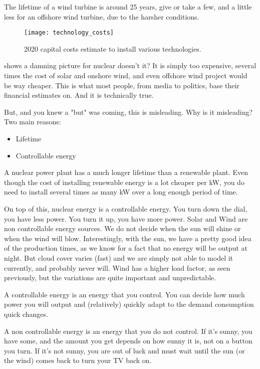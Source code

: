 The lifetime of a wind turbine is around 25 years, give or take a few, and a little less for an offshore wind turbine, due to the harsher conditions.



\begin{figure}[hb]
	\texttt{[image: technology\_costs]}
	\caption[2020 capital costs estimate to install various technologies]{2020 capital costs estimate to install various technologies.}
\end{figure}


 shows a damning picture for nuclear doesn't it? It is simply too expensive, several times the cost of solar and onshore wind, and even offshore wind project would be way cheaper. This is what most people, from media to politics, base their financial estimates on. And it is technically true.

But, and you knew a "but" was coming, this is misleading. Why is it misleading? Two main reasons:


\begin{itemize}
	\item Lifetime
	\item Controllable energy
\end{itemize}

A nuclear power plant has a much longer lifetime than a renewable plant. Even though the cost of installing renewable energy is a lot cheaper per kW, you do need to install several times as many kW over a long enough period of time.

On top of this, nuclear energy is a controllable energy. You turn down the dial, you have less power. You turn it up, you have more power. Solar and Wind are non controllable energy sources. We do not decide when the sun will shine or when the wind will blow. Interestingly, with the sun, we have a pretty good idea of the production times, as we know for a fact that no energy will be output at night. But cloud cover varies (fast) and we are simply not able to model it currently, and probably never will. Wind has a higher load factor, as seen previously, but the variations are quite important and unpredictable.


\begin{kaobox}[frametitle=Controllable versus Non Controllable]
A controllable energy is an energy that you control. You can decide how much power you will output and (relatively) quickly adapt to the demand consumption quick changes.

A non controllable energy is an energy that you do not control. If it's sunny, you have some, and the amount you get depends on how sunny it is, not on a button you turn. If it's not sunny, you are out of luck and must wait until the sun (or the wind) comes back to turn your TV back on. 
\end{kaobox}


